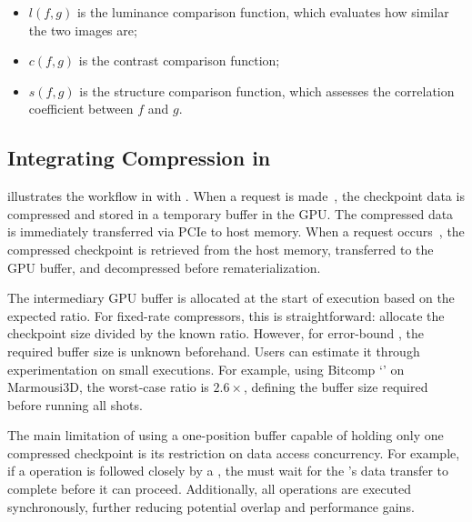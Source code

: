 \documentclass[Ingles]{ic-tese-v3}
\begin{document}
\begin{itemize}
    \item $l(f, g)$ is the luminance comparison function, which evaluates how similar the two images are;
    \item $c(f, g)$ is the contrast comparison function;
    \item $s(f, g)$ is the structure comparison function, which assesses the correlation coefficient between $f$ and $g$.
\end{itemize}



\subsection{Integrating Compression in \awave}
\label{sec:comp_awave}
 illustrates the \checkpointing workflow in \awave with \compression. When a \save request is made~, the checkpoint data is compressed and stored in a temporary buffer in the GPU. The compressed data is immediately transferred via PCIe to host memory. When a \restore request occurs~, the compressed checkpoint is retrieved from the host memory, transferred to the GPU buffer, and decompressed before rematerialization.

The intermediary GPU buffer is allocated at the start of execution based on the expected \compression ratio. For fixed-rate compressors, this is straightforward: allocate the checkpoint size divided by the known \compression ratio. However, for error-bound \compression, the required buffer size is unknown beforehand. Users can estimate it through experimentation on small executions. For example, using Bitcomp `' on Marmousi3D, the worst-case \compression ratio is $2.6\times$, defining the buffer size required before running all shots.

The main limitation of using a one-position buffer capable of holding only one compressed checkpoint is its restriction on data access concurrency. For example, if a \save operation is followed closely by a \restore, the \restore must wait for the \save's data transfer to complete before it can proceed. Additionally, all \restore operations are executed synchronously, further reducing potential overlap and performance gains.

\end{document}
